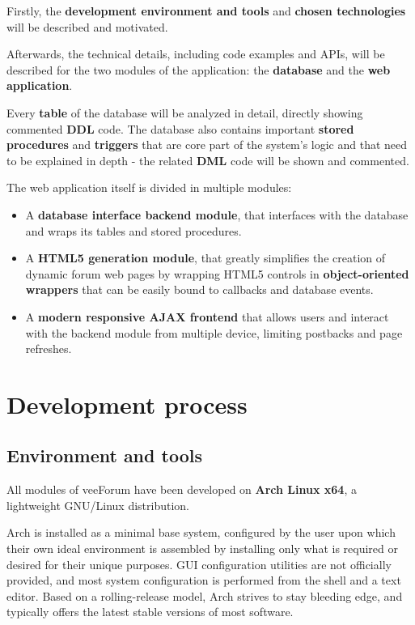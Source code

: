 \documentclass[12pt]{report}
\renewcommand\emph{\textbf}
\begin{document}
        Firstly, the \emph{development environment and tools} and \emph{chosen technologies} will be described and motivated.

        Afterwards, the technical details, including code examples and APIs, will be described for the two modules of the application: the \emph{database} and the \emph{web application}.

        Every \emph{table} of the database will be analyzed in detail, directly showing commented \emph{DDL} code. The database also contains important \emph{stored procedures} and \emph{triggers} that are core part of the system's logic and that need to be explained in depth - the related \emph{DML} code will be shown and commented.

        The web application itself is divided in multiple modules:
        \begin{itemize}
            \item A \emph{database interface backend module}, that interfaces with the database and wraps its tables and stored procedures.
            \item A \emph{HTML5 generation module}, that greatly simplifies the creation of dynamic forum web pages by wrapping HTML5 controls in \emph{object-oriented wrappers} that can be easily bound to callbacks and database events.
            \item A \emph{modern responsive AJAX frontend} that allows users and interact with the backend module from multiple device, limiting postbacks and page refreshes.
        \end{itemize}

        \chapter{Development process}

            \section{Environment and tools}
                All modules of veeForum have been developed on \emph{Arch Linux x64}, a lightweight GNU/Linux distribution.

                Arch is installed as a minimal base system, configured by the user upon which their own ideal environment is assembled by installing only what is required or desired for their unique purposes. GUI configuration utilities are not officially provided, and most system configuration is performed from the shell and a text editor. Based on a rolling-release model, Arch strives to stay bleeding edge, and typically offers the latest stable versions of most software.
\end{document}
